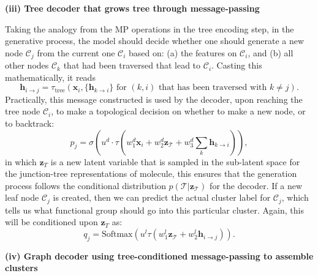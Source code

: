 \begin{myquote}
\textbf{(iii) Tree decoder that grows tree through message-passing}

\hspace{10pt} Taking the analogy from the MP operations in the tree encoding step, in the generative process, the model should decide whether one should generate a new node $\mathcal{C}_j$ from the current one $\mathcal{C}_i$ based on: (a) the features on $\mathcal{C}_i$, and (b) all other nodes $\mathcal{C}_k$ that had been traversed that lead to $\mathcal{C}_i$. Casting this mathematically, it reads
\begin{equation*}
    \bm{h}_{i\to j}=\tau_{\mathrm{tree}}\left(\bm{x}_i,\Big\{ \bm{h}_{k\to i}\Big\}\mbox{ for }(k,i)\mbox{ that has been traversed with } k\neq j\right).
\end{equation*}
 Practically, this message constructed is used by the decoder, upon reaching the tree node $\mathcal{C}_i$, to make a topological decision on whether to make a new node, or to backtrack:
\begin{equation*}
    p_j =\sigma\left( u^d\cdot \tau\left( w_1^d \bm{x}_i+w_2^d \bm{z}_{\mathcal{T}} +w_3^d \sum_k \bm{h}_{k\to i} \right) \right),
\end{equation*}
in which $\bm{z}_T$ is a new latent variable that is sampled in the sub-latent space for the junction-tree representations of molecule, this ensures that the generation process follows the conditional distribution $p(\mathcal{T}|\bm{z}_\mathcal{T})$ for the decoder. If a new leaf node $\mathcal{C}_j$ is created, then we can predict the actual cluster label for $\mathcal{C}_j$, which tells us what functional group should go into this particular cluster. Again, this will be conditioned upon $\bm{z}_T$  as:
\begin{equation*}
    q_{j}=\mbox{Softmax}\left(u^{l}\tau\left(w_1^l \bm{z}_{\mathcal{T}}+w_2^l \bm{h}_{i\to j} \right)\right).
\end{equation*}

\textbf{(iv) Graph decoder using tree-conditioned message-passing to assemble clusters}


\end{myquote}
